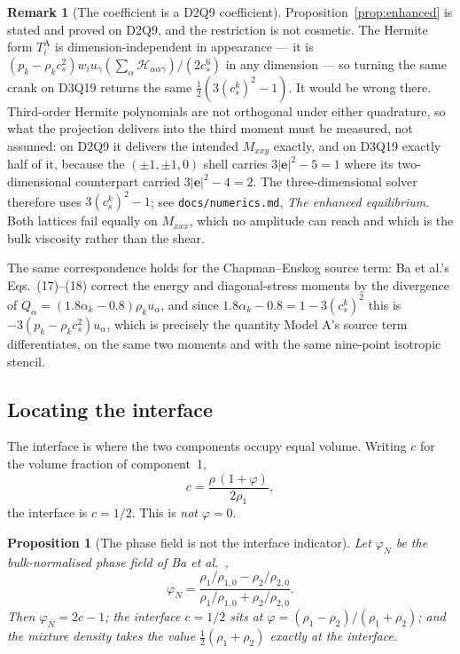 \documentclass[11pt,a4paper]{article}
\theoremstyle{plain}
\newtheorem{proposition}{Proposition}
\theoremstyle{definition}
\newtheorem{remark}{Remark}
\newcommand{\ee}{\mathbf{e}}
\newcommand{\cs}{c_s}
\begin{document}
\begin{remark}[The coefficient is a D2Q9 coefficient]
Proposition~\ref{prop:enhanced} is stated and proved on D2Q9, and the
restriction is not cosmetic. The Hermite form $T^{\mathrm{A}}_i$ is
dimension-independent in appearance --- it is
$(p_k - \rho_k\cs^2)w_i u_\gamma(\sum_\alpha \mathcal{H}_{\alpha\alpha\gamma})
/(2\cs^6)$ in any dimension --- so turning the same crank on D3Q19 returns the
same $\tfrac12(3(\cs^k)^2-1)$. It would be wrong there. Third-order Hermite
polynomials are not orthogonal under either quadrature, so what the projection
delivers into the third moment must be measured, not assumed: on D2Q9 it
delivers the intended $M_{xxy}$ exactly, and on D3Q19 exactly half of it,
because the $(\pm1,\pm1,0)$ shell carries $3|\ee|^2-5=1$ where its
two-dimensional counterpart carried $3|\ee|^2-4=2$. The three-dimensional
solver therefore uses $3(\cs^k)^2-1$; see \texttt{docs/numerics.md}, \emph{The
enhanced equilibrium}. Both lattices fail equally on $M_{xxx}$, which no
amplitude can reach and which is the bulk viscosity rather than the shear.
\end{remark} The same correspondence holds for the Chapman--Enskog
source term: Ba et al.'s Eqs.~(17)--(18) correct the energy and diagonal-stress
moments by the divergence of $Q_\alpha = (1.8\alpha_k - 0.8)\rho_k u_\alpha$,
and since $1.8\alpha_k - 0.8 = 1 - 3(\cs^k)^2$ this is
$-3(p_k - \rho_k\cs^2)u_\alpha$, which is precisely the quantity Model A's
source term differentiates, on the same two moments and with the same nine-point
isotropic stencil.

\subsection{Locating the interface}

The interface is where the two components occupy equal volume. Writing $c$ for
the volume fraction of component~1,
\begin{equation}
  c = \frac{\rho\,(1+\varphi)}{2\rho_1},
\end{equation}
the interface is $c = 1/2$. This is \emph{not} $\varphi = 0$.

\begin{proposition}[The phase field is not the interface indicator]
\label{prop:interface}
Let $\varphi_N$ be the bulk-normalised phase field of Ba et al.~\cite{ba2016},
\begin{equation}
  \varphi_N = \frac{\rho_1/\rho_{1,0} - \rho_2/\rho_{2,0}}
                   {\rho_1/\rho_{1,0} + \rho_2/\rho_{2,0}}.
  \label{eq:phin}
\end{equation}
Then $\varphi_N = 2c - 1$; the interface $c = 1/2$ sits at
$\varphi = (\rho_1 - \rho_2)/(\rho_1 + \rho_2)$; and the mixture density takes
the value $\tfrac12(\rho_1 + \rho_2)$ exactly at the interface.
\end{proposition}
\end{document}
